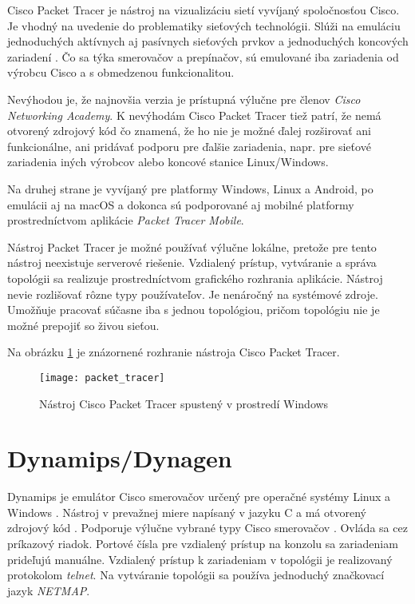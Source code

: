 Cisco Packet Tracer je nástroj na vizualizáciu sietí vyvíjaný spoločnosťou Cisco. Je vhodný na uvedenie do problematiky sieťových technológii. Slúži na emuláciu jednoduchých aktívnych aj pasívnych sieťových prvkov a jednoduchých koncových zariadení \cite{packet_tracer}. Čo sa týka smerovačov a prepínačov, sú emulované iba zariadenia od výrobcu Cisco a s obmedzenou funkcionalitou.

Nevýhodou je, že najnovšia verzia je prístupná výlučne pre členov \emph{Cisco Networking Academy}. K nevýhodám Cisco Packet Tracer tiež patrí, že nemá otvorený zdrojový kód čo znamená, že ho nie je možné ďalej rozširovať ani funkcionálne, ani pridávať podporu pre ďalšie zariadenia, napr. pre sieťové zariadenia iných výrobcov alebo koncové stanice Linux/Windows. 

Na druhej strane je vyvíjaný pre platformy Windows, Linux a Android, po emulácii aj na macOS \cite{packet_tracer_mac} a dokonca sú podporované aj mobilné platformy prostredníctvom aplikácie \emph{Packet Tracer Mobile}.

Nástroj Packet Tracer je možné používať výlučne lokálne, pretože pre tento nástroj neexistuje serverové riešenie. Vzdialený prístup, vytváranie a správa topológii sa realizuje prostredníctvom grafického rozhrania aplikácie. Nástroj nevie rozlišovať rôzne typy používateľov. Je nenáročný na systémové zdroje. Umožňuje pracovať súčasne iba s jednou topológiou, pričom topológiu nie je možné prepojiť so živou sieťou.

Na obrázku \ref{obr:packet_tracer} je znázornené rozhranie nástroja Cisco Packet Tracer.

\begin{figure}
    \centering
    \texttt{[image: packet\_tracer]}
    \caption{Nástroj Cisco Packet Tracer spustený v prostredí Windows}
    \cite{obr_packet_tracer}
    \label{obr:packet_tracer}
\end{figure}





\section{Dynamips/Dynagen}

Dynamips je emulátor Cisco smerovačov určený pre operačné systémy Linux a Windows \cite{dynamips}. Nástroj v prevažnej miere napísaný v jazyku C a má otvorený zdrojový kód \cite{dynamips_github}. Podporuje výlučne vybrané typy Cisco smerovačov \cite{dynamips}. Ovláda sa cez príkazový riadok. Portové čísla pre vzdialený prístup na konzolu sa zariadeniam prideľujú manuálne. Vzdialený prístup k zariadeniam v topológii je realizovaný protokolom \emph{telnet}. Na vytváranie topológii sa používa jednoduchý značkovací jazyk \emph{NETMAP}.

